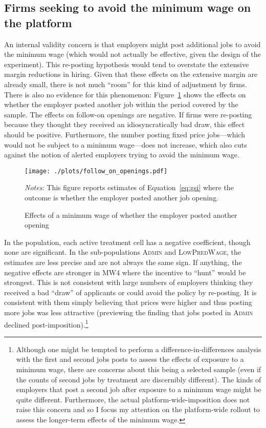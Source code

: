 \documentclass[AER]{AEA}
\newcommand{\admin}{\textsc{Admin}}
\newcommand{\lpw}{\textsc{LowPredWage}}
\begin{document}
\subsection{Firms seeking to avoid the minimum wage on the platform} \label{sec:firm_sorting_time}
An internal validity concern is that employers might post additional jobs to avoid the minimum wage (which would not actually be effective, given the design of the experiment).
This re-posting hypothesis would tend to overstate the extensive margin reductions in hiring.
Given that these effects on the extensive margin are already small, there is not much ``room'' for this kind of adjustment by firms.
There is also no evidence for this phenomenon:
Figure~\ref{fig:all_new_follow_on_openings} shows the effects on whether the employer posted another job within the period covered by the sample.
The effects on follow-on openings are negative. 
If firms were re-posting because they thought they received an idiosyncratically bad draw, this effect should be positive.
Furthermore, the number posting fixed price jobs---which would not be subject to a minimum wage---does not increase, which also cuts against the notion of alerted employers trying to avoid the minimum wage.

\begin{figure}[h!]
  \centering
  \caption{Effects of a minimum wage of whether the employer posted another opening} \label{fig:all_new_follow_on_openings}
  \begin{minipage}{1.15\linewidth}
  \texttt{[image: ./plots/follow\_on\_openings.pdf]}
  \end{minipage}
  \begin{minipage}{0.95\linewidth}
    {\footnotesize
      \emph{Notes:} This figure reports estimates of Equation~\ref{eq:gsi} where the outcome is whether the employer posted another job opening. 
    }
\end{minipage} 
\end{figure} 

In the population, each active treatment cell has a negative coefficient, though none are significant.
In the sub-populations \admin{} and \lpw{}, the estimates are less precise and are not always the same sign.
If anything, the negative effects are stronger in MW4 where the incentive to ``hunt'' would be strongest.
This is not consistent with large numbers of employers thinking they received a bad ``draw'' of applicants or could avoid the policy by re-posting.
It is consistent with them simply believing that prices were higher
and thus posting more jobs was less attractive (previewing the finding
that jobs posted in \admin{} declined post-imposition).\footnote{
  Although one might be tempted to perform a difference-in-differences analysis with the first and second jobs posts to assess the effects of exposure to a minimum wage, there are concerns about this being a selected sample (even if the counts of second jobs by treatment are discernibly different).
  The kinds of employers that post a second job after exposure to a minimum wage might be quite different.
  Furthermore, the actual platform-wide-imposition does not raise this concern and so I focus my attention on the platform-wide rollout to assess the longer-term effects of the minimum wage. 
} 
\end{document}
